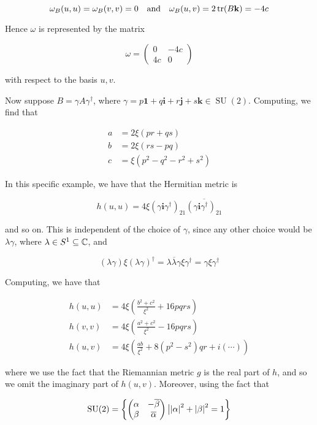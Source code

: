 \documentclass{article}
\DeclareMathOperator{\SU}{SU}
\begin{document}
\[\omega_B(u, u) = \omega_B(v, v) = 0 \qqtext{and}\omega_B(u, v) = 2\tr(B\mathbf k) = -4c\]

Hence \(\omega\) is represented by the matrix

\[\omega = \begin{pmatrix}
    0 & -4c \\ 4c & 0
\end{pmatrix}\]

with respect to the basis \(u, v\).

Now suppose \(B = \gamma A\gamma^\dagger\), where \(\gamma = p\mathbf{1} + q\mathbf i + r\mathbf j + s\mathbf k \in \SU(2)\). Computing, we find that

\begin{align*}
    a &= 2\xi(pr + qs) \\
    b &= 2\xi(rs - pq) \\
    c &= \xi(p^2 - q^2 - r^2 + s^2)
\end{align*}

In this specific example, we have that the Hermitian metric is

\[h(u, u) = 4\xi(\gamma\mathbf i \gamma^\dagger)_{21}\overline{(\gamma\mathbf i \gamma^\dagger)_{21}}\]

and so on. This is independent of the choice of \(\gamma\), since any other choice would be \(\lambda \gamma\), where \(\lambda \in S^1 \subseteq \mathbb{C}\), and

\[(\lambda \gamma)\xi(\lambda \gamma)^\dagger = \lambda \overline\lambda \gamma \xi \gamma^\dagger = \gamma\xi \gamma^\dagger\]

Computing, we have that

\begin{align*}
    h(u, u) &= 4\xi\left(\frac{b^2+c^2}{\xi^2} + 16pqrs\right) \\
    h(v, v) &= 4\xi\left(\frac{a^2 + c^2}{\xi^2} - 16pqrs\right) \\
    h(u, v) &= 4\xi\left(\frac{ab}{\xi^2} + 8(p^2 - s^2)qr + i(\cdots)\right)
\end{align*}

where we use the fact that the Riemannian metric \(g\) is the real part of \(h\), and so we omit the imaginary part of \(h(u, v)\). Moreover, using the fact that

\[\SU(2) = \left\{\begin{pmatrix}
    \alpha & -\overline\beta \\
    \beta & \overline\alpha
\end{pmatrix} \big\vert \abs{\alpha}^2 + \abs{\beta}^2 = 1\right\}\]
\end{document}
